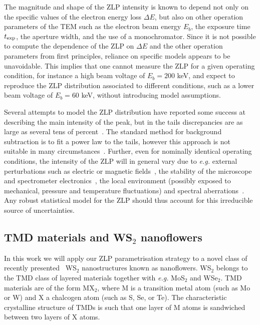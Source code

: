 The magnitude and shape of the ZLP intensity is known to depend not only on the specific values
of the electron energy loss $\Delta E$, but also on other operation parameters
of the TEM such as the electron beam energy $E_{b}$, the exposure time
$t_{\rm exp}$, the aperture width, and the use of a monochromator.
%
Since it is not possible to compute the dependence of the ZLP on $\Delta E$
and the other operation parameters from first principles,
reliance on specific models appears to be unavoidable.
%
This implies that one cannot measure the ZLP for a given operating
condition, for instance a high beam voltage of $E_{b}=200$ keV, and expect to reproduce
the ZLP distribution
associated to different conditions, such as a lower beam voltage of $E_{b}=60$ keV,
without introducing model assumptions.



Several attempts to model the ZLP distribution have reported
some success at describing the main intensity of the peak, 
but in the tails discrepancies are as large as several tens of percent~\cite{Bangert:2003}.
%
The standard method for background subtraction
is to fit a power law to the tails, however this approach is not suitable in
many circumstances~\cite{Hachtel:2018, Tenailleau:1992, Reed:2002, Bosman:2006}.
%
Further, even for nominally identical operating conditions, the intensity of the ZLP
will in general vary due to {\it e.g.} external perturbations such as electric or magnetic fields~\cite{Rafferty:2000},
the stability of the microscope and spectrometer electronics~\cite{Kothleitner:2003}, the local
environment (possibly exposed to mechanical, pressure and temperature fluctuations) 
and spectral aberrations~\cite{Egerton:1996}. 
%
Any robust statistical model for the ZLP should thus account for this irreducible source of uncertainties.



\subsection{TMD materials and WS$_2$ nanoflowers}
\label{sec:eels}

In this work we will apply our ZLP parametrisation strategy
 to a novel class of recently presented~\cite{SabryaWS2} WS$_2$ nanostructures known
as nanoflowers.
%
WS$_2$ belongs to the TMD class of layered materials together with {\it e.g.}
MoS$_2$ and WSe$_2$.
%
TMD materials are of the form MX$_2$, where M is a 
transition metal atom (such as Mo or W) and X a chalcogen atom (such as S, Se, or Te). 
%
The characteristic crystalline structure of TMDs is such that
one layer of M atoms is sandwiched between two layers of X atoms.

